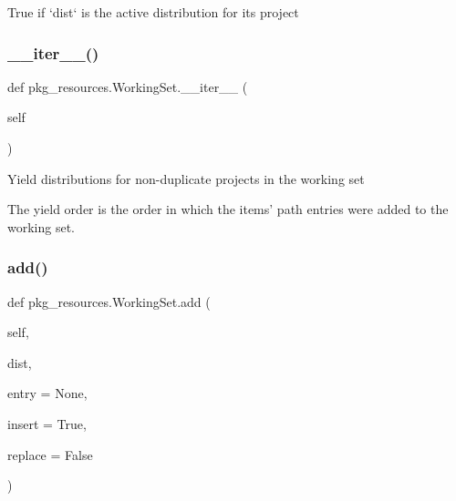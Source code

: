 \begin{DoxyVerb}True if `dist` is the active distribution for its project\end{DoxyVerb}
 \mbox{\label{classpkg__resources_1_1_working_set_a59bda285ab373ec1cc8b22b0e24c460c}} 
\subsubsection{\texorpdfstring{\+\_\+\+\_\+iter\+\_\+\+\_\+()}{\_\_iter\_\_()}}
{\footnotesize\ttfamily def pkg\+\_\+resources.\+Working\+Set.\+\_\+\+\_\+iter\+\_\+\+\_\+ (\begin{DoxyParamCaption}\item[{}]{self }\end{DoxyParamCaption})}

\begin{DoxyVerb}Yield distributions for non-duplicate projects in the working set

The yield order is the order in which the items' path entries were
added to the working set.
\end{DoxyVerb}
 \mbox{\label{classpkg__resources_1_1_working_set_ab12bd19b39a01d6013544ab543401a16}} 
\subsubsection{\texorpdfstring{add()}{add()}}
{\footnotesize\ttfamily def pkg\+\_\+resources.\+Working\+Set.\+add (\begin{DoxyParamCaption}\item[{}]{self,  }\item[{}]{dist,  }\item[{}]{entry = {\ttfamily None},  }\item[{}]{insert = {\ttfamily True},  }\item[{}]{replace = {\ttfamily False} }\end{DoxyParamCaption})}

